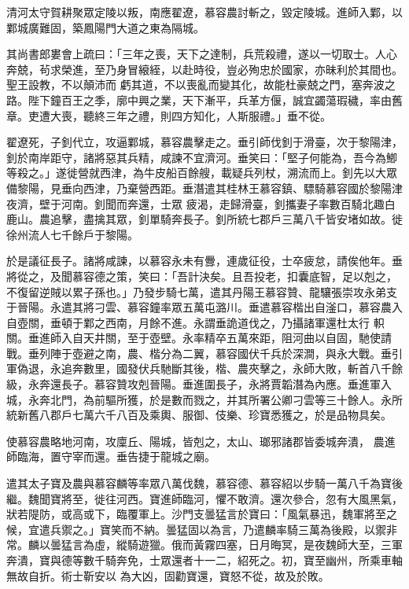 \begin{pinyinscope}
 清河太守賀耕聚眾定陵以叛，南應翟遼，慕容農討斬之，毀定陵城。進師入鄴，以鄴城廣難固，築鳳陽門大道之東為隔城。



 其尚書郎婁會上疏曰：「三年之喪，天下之達制，兵荒殺禮，遂以一切取士。人心奔兢，茍求榮進，至乃身冒縗絰，以赴時役，豈必殉忠於國家，亦昧利於其間也。聖王設教，不以顛沛而
 虧其道，不以喪亂而變其化，故能杜豪兢之門，塞奔波之路。陛下鐘百王之季，廓中興之業，天下漸平，兵革方偃，誠宜蠲蕩瑕穢，率由舊章。吏遭大喪，聽終三年之禮，則四方知化，人斯服禮。」垂不從。



 翟遼死，子釗代立，攻逼鄴城，慕容農擊走之。垂引師伐釗于滑臺，次于黎陽津，釗於南岸距守，諸將惡其兵精，咸諫不宜濟河。垂笑曰：「堅子何能為，吾今為鯽等殺之。」遂徙營就西津，為牛皮船百餘艘，載疑兵列杖，溯流而上。釗先以大眾備黎陽，見垂向西津，乃棄營西距。垂潛遣其桂林王慕容鎮、驃騎慕容國於黎陽津夜濟，壁于河南。釗聞而奔還，士眾
 疲渴，走歸滑臺，釗攜妻子率數百騎北趣白鹿山。農追擊，盡擒其眾，釗單騎奔長子。釗所統七郡戶三萬八千皆安堵如故。徙徐州流人七千餘戶于黎陽。



 於是議征長子。諸將咸諫，以慕容永未有釁，連歲征役，士卒疲怠，請俟他年。垂將從之，及聞慕容德之策，笑曰：「吾計決矣。且吾投老，扣囊底智，足以剋之，不復留逆賊以累子孫也。」乃發步騎七萬，遣其丹陽王慕容贊、龍驤張崇攻永弟支于晉陽。永遣其將刁雲、慕容鐘率眾五萬屯潞川。垂遣慕容楷出自滏口，慕容農入自壺關，垂頓于鄴之西南，月餘不進。永謂垂詭道伐之，乃攝諸軍還杜太行
 軹關。垂進師入自天井關，至于壺壁。永率精卒五萬來距，阻河曲以自固，馳使請戰。垂列陣于壺避之南，農、楷分為二翼，慕容國伏千兵於深澗，與永大戰。垂引軍偽退，永追奔數里，國發伏兵馳斷其後，楷、農夾擊之，永師大敗，斬首八千餘級，永奔還長子。慕容贊攻剋晉陽。垂進圍長子，永將賈韜潛為內應。垂進軍入城，永奔北門，為前驅所獲，於是數而戮之，并其所署公卿刁雲等三十餘人。永所統新舊八郡戶七萬六千八百及乘輿、服御、伎樂、珍寶悉獲之，於是品物具矣。



 使慕容農略地河南，攻廩丘、陽城，皆剋之，太山、瑯邪諸郡皆委城奔潰，
 農進師臨海，置守宰而還。垂告捷于龍城之廟。



 遣其太子寶及農與慕容麟等率眾八萬伐魏，慕容德、慕容紹以步騎一萬八千為寶後繼。魏聞寶將至，徙往河西。寶進師臨河，懼不敢濟。還次參合，忽有大風黑氣，狀若隄防，或高或下，臨覆軍上。沙門支曇猛言於寶曰：「風氣暴迅，魏軍將至之候，宜遣兵禦之。」寶笑而不納。曇猛固以為言，乃遣麟率騎三萬為後殿，以禦非常。麟以曇猛言為虛，縱騎遊獵。俄而黃霧四塞，日月晦冥，是夜魏師大至，三軍奔潰，寶與德等數千騎奔免，士眾還者十一二，紹死之。初，寶至幽州，所乘車軸無故自折。術士靳安以
 為大凶，固勸寶還，寶怒不從，故及於敗。




\end{pinyinscope}

